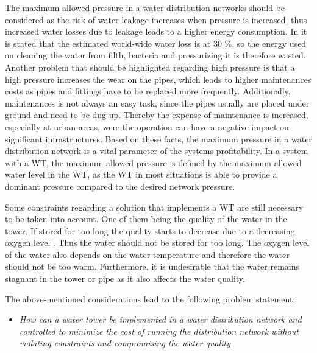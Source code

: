 The maximum allowed pressure in a water distribution networks should be considered as the risk of water leakage increases when pressure is increased\cite{feldman2009aspects}, thus increased water losses due to leakage leads to a higher energy consumption. In \cite{feldman2009aspects} it is stated that the estimated world-wide water loss is at 30 \%, so the energy used on cleaning the water from filth, bacteria and pressurizing it is therefore wasted. Another problem that should be highlighted regarding high pressure is that a high pressure increases the wear on the pipes\cite{Watts_water}, which leads to higher maintenances costs as pipes and fittings have to be replaced more frequently. Additionally, maintenances is not always an easy task, since the pipes usually are placed under ground and need to be dug up. Thereby the expense of maintenance is increased, especially at urban areas, were the operation can have a negative impact on significant infrastructures. Based on these facts, the maximum pressure in a water distribution network is a vital parameter of the systems profitability. In a system with a WT, the maximum allowed pressure is defined by the maximum allowed water level in the WT, as the WT in most situations is able to provide a dominant pressure compared to the desired network pressure.

Some constraints regarding a solution that implements a WT are still necessary to be taken into account. One of them being the quality of the water in the tower. If stored for too long the quality starts to decrease due to a decreasing oxygen level \cite{Lenntech,DO}. Thus the water should not be stored for too long. The oxygen level of the water also depends on the water temperature and therefore the water should not be too warm. Furthermore, it is undesirable that the water remains stagnant in the tower or pipe as it also affects the water quality.

The above-mentioned considerations lead to the following problem statement:
\begin{itemize}
\item \textit{How can a water tower be implemented in a water distribution network and controlled to minimize the cost of running the distribution network without violating constraints and compromising the water quality.}
\end{itemize} 



